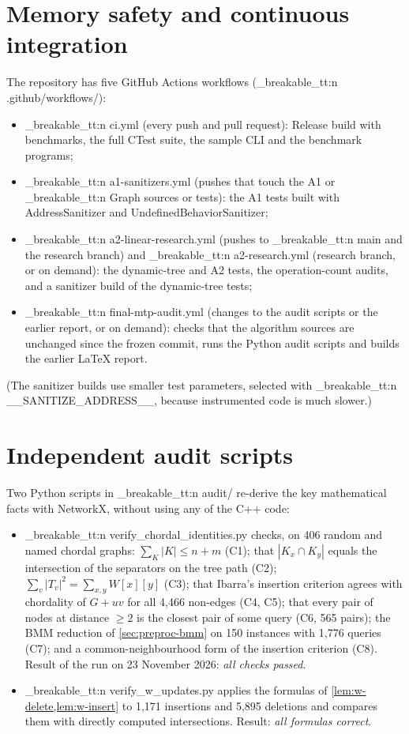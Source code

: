 \documentclass[11pt,a4paper,oneside]{report}
\theoremstyle{plain}
\theoremstyle{definition}
\theoremstyle{remark}
\DeclareRobustCommand{\code}[1]{\mtp_breakable_tt:n {#1}}
\DeclareRobustCommand{\file}[1]{\mtp_breakable_tt:n {#1}}
\begin{document}
\section{Memory safety and continuous integration}\label{sec:ci}
The repository has five GitHub Actions workflows (\file{.github/workflows/}):
\begin{itemize}
\item \file{ci.yml} (every push and pull request): Release build with benchmarks, the full
  CTest suite, the sample CLI and the benchmark programs;
\item \file{a1-sanitizers.yml} (pushes that touch the A1 or \code{Graph} sources or tests): the
  A1 tests built with AddressSanitizer and UndefinedBehaviorSanitizer;
\item \file{a2-linear-research.yml} (pushes to \code{main} and the research branch) and
  \file{a2-research.yml} (research branch, or on demand): the dynamic-tree and A2 tests, the
  operation-count audits, and a sanitizer build of the dynamic-tree tests;
\item \file{final-mtp-audit.yml} (changes to the audit scripts or the earlier report, or on
  demand): checks that the algorithm sources are unchanged since the frozen commit, runs the
  Python audit scripts and builds the earlier LaTeX report.
\end{itemize}
(The sanitizer builds use smaller test parameters, selected with \code{__SANITIZE_ADDRESS__},
because instrumented code is much slower.)

\section{Independent audit scripts}\label{sec:audit-scripts}
Two Python scripts in \file{audit/} re-derive the key mathematical facts with NetworkX, without
using any of the C++ code:
\begin{itemize}
\item \file{verify_chordal_identities.py} checks, on 406 random and named chordal graphs:
  \(\sum_K|K|\le n+m\) (C1); that \(|K_x\cap K_y|\) equals the intersection of the separators
  on the tree path (C2); \(\sum_v|T_v|^2=\sum_{x,y}W[x][y]\) (C3); that Ibarra's insertion
  criterion agrees with chordality of \(G+uv\) for all 4{,}466 non-edges (C4, C5); that every
  pair of nodes at distance \(\ge2\) is the closest pair of some query (C6, 565 pairs); the BMM
  reduction of \cref{sec:preproc-bmm} on 150 instances with 1{,}776 queries (C7); and a
  common-neighbourhood form of the insertion criterion (C8). Result of the run on
  23 November 2026: \emph{all checks passed}.
\item \file{verify_w_updates.py} applies the formulas of \cref{lem:w-delete,lem:w-insert} to
  1{,}171 insertions and 5{,}895 deletions and compares them with directly computed
  intersections. Result: \emph{all formulas correct}.
\end{itemize}
\end{document}
